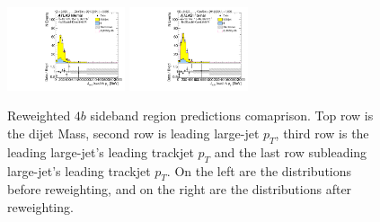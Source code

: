 \begin{figure}[htbp!]
\begin{center}
\includegraphics[width=0.31\textwidth,angle=-90]{figures/boosted/Prereweight/Moriond_FourTag_Sideband_sublHCand_trk0_Pt.pdf}
\includegraphics[width=0.31\textwidth,angle=-90]{figures/boosted/Sideband/b77_FourTag_Sideband_sublHCand_trk0_Pt.pdf}\\
\caption{Reweighted $4b$ sideband region predictions comaprison. Top row is the dijet Mass, second row is leading large-\R jet $p_{T}$, third row is the leading large-\R jet's leading trackjet $p_T$ and the last row subleading large-\R jet's leading trackjet $p_T$. On the left are the distributions before reweighting, and on the right are the distributions after reweighting.}
\label{fig:rw-4b-comp-sb}
\end{center}
\end{figure}




